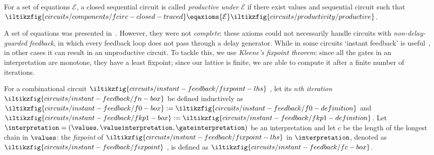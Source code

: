 \documentclass[10pt]{article}
\begin{document}
    \begin{definition}[Productivity]
        For a set of equations \(\mathcal{E}\), a closed sequential circuit  is called \emph{productive under} \(\mathcal{E}\) if there exist values  and sequential circuit  such that
        \(
            \iltikzfig{circuits/components/fcirc-closed-traced} 
            \eqaxioms{\mathcal{E}}
            \iltikzfig{circuits/productivity/productive}
        \).
    \end{definition}

    \noindent
    A set of equations was presented in~\cite{ghica2016categorical}.
    However, they were not \emph{complete}: these axioms could not necessarily handle circuits with \emph{non-delay-guarded feedback}, in which every feedback loop does not pass through a delay generator.
    While in some circuits `instant feedback' is useful~\cite{riedel2004cyclic,mendler2012constructive}, in other cases it can result in an unproductive circuit.
    To tackle this, we use \emph{Kleene's fixpoint theorem}: since all the gates in an interpretation are monotone, they have a least fixpoint; since our lattice is finite, we are able to compute it after a finite number of iterations.

    \begin{definition}
    
        For a combinational circuit 
        \(\iltikzfig{circuits/instant-feedback/fixpoint-lhs}\)
        , let its \emph{\(n\)th iteration} 
        \(\iltikzfig{circuits/instant-feedback/fn-box}\) 
        be defined inductively as 
        \(
            \iltikzfig{circuits/instant-feedback/f0-box} 
            := 
            \iltikzfig{circuits/instant-feedback/f0-definition}
        \) 
        and 
        \(
            \iltikzfig{circuits/instant-feedback/fkp1-box} 
            := 
            \iltikzfig{circuits/instant-feedback/fkp1-definition}
        \).
        Let \(\interpretation = (\values,\valueinterpretation,\gateinterpretation)\) be an interpretation and let \(c\) be the length of the longest chain in \(\values\): the \emph{fixpoint} of 
        \(\iltikzfig{circuits/instant-feedback/fixpoint-lhs}\)
        in \(\interpretation\), denoted as 
        \(\iltikzfig{circuits/instant-feedback/fixpoint}\)
        , is defined as \(\iltikzfig{circuits/instant-feedback/fc-box}\).
    \end{definition}
\end{document}
